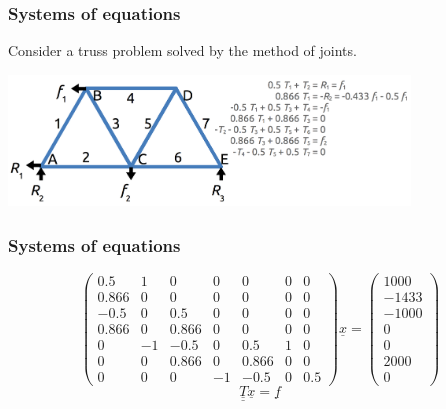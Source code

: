 \documentclass[11pt]{beamer}
\begin{document}
\begin{frame}[fragile]
  \frametitle{Systems of equations}
  \Enlarge

  \begin{enumerate}
  \myitem  Consider a truss problem solved by the method of joints.
  \end{enumerate}
  \includegraphics[width=0.8\textwidth]{./truss-graphic.png}
\end{frame}

\begin{frame}[fragile]
  \frametitle{Systems of equations}

  $$
\left( \begin{array}{ccccccc}
  0.5 & 1 & 0 & 0 & 0 & 0 & 0 \\
  0.866 & 0 & 0 & 0 & 0 & 0 & 0 \\
  -0.5 & 0 & 0.5 & 0 & 0 & 0 & 0 \\
  0.866 & 0 & 0.866 & 0 & 0 & 0 & 0 \\
  0 & -1 & -0.5 & 0 & 0.5 & 1 & 0 \\
  0 & 0 & 0.866 & 0 & 0.866 & 0 & 0 \\
  0 & 0 & 0 & -1 & -0.5 & 0 & 0.5
\end{array} \right)
\underline{x}
=
\left( \begin{array}{c}
  1000 \\
  -1433 \\
  -1000 \\
  0 \\
  0 \\
  2000 \\
  0
\end{array} \right)
  $$
  $$
\underline{\underline{T}} \underline{x} = \underline{f}
  $$
  \begin{enumerate}
  \end{enumerate}
\end{frame}
\end{document}
